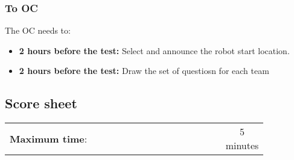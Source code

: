 \subsubsection*{To OC}
The OC needs to:
\begin{itemize}
	\item \textbf{2 hours before the test:} Select and announce the robot start location.
	\item \textbf{2 hours before the test:} Draw the set of questiosn for each team
\end{itemize}

\newpage
\subsection*{Score sheet}

\begin{table}[h]
	\begin{tabular}{m{0.85\linewidth} c}
		\textbf{Maximum time}: & 5 minutes \\
	\end{tabular}
\end{table}

\begin{scorelist}




\end{scorelist}

\clearpage
